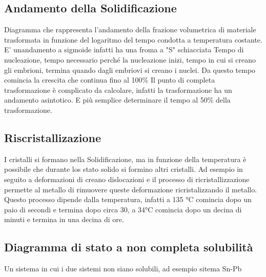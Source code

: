 \documentclass{article}%
\begin{document}
%
\subsection{ Andamento della Solidificazione }%
\label{subsec:AndamentodellaSolidificazione}%
Diagramma che rappresenta l'andamento della frazione volumetrica di materiale trasformata in funzione del logaritmo del tempo condotta a temperatura costante.\newline%
%
\newline%
%
E' unandamento a sigmoide infatti ha una froma a "S" schiacciata\newline%
%
\newline%
%
Tempo di nucleazione, tempo necessario perché la nucleazione inizi, tempo in cui si creano gli embrioni, termina quando dagli embriovi si creano i nuclei.\newline%
%
Da questo tempo comincia la crescita che continua fino al 100\%\newline%
%
Il punto di completa trasformazione è complicato da calcolare, infatti la trasformazione ha un andamento asintotico.\newline%
%
E più semplice determinare il tempo al 50\% della trasformazione.\newline%
%
\newline%

%
\subsection{ Riscristallizazione }%
\label{subsec:Riscristallizazione}%
I cristalli si formano nella Solidificazione, ma in funzione della temperatura è possibile che durante los stato solido si formino altri cristalli.\newline%
%
Ad esempio in seguito a deformazioni di creano dislocazioni e il processo di ricristallizzazione permette al metallo di rimuovere queste deformazione ricristalizzando il metallo.\newline%
%
\newline%
%
Questo processo dipende dalla temperatura, infatti a 135 °C comincia dopo un paio di secondi e termina dopo circa 30, a 34°C comincia dopo un decina di minuti e termina in una decina di ore.\newline%
%
\newline%

%
\subsection{ Diagramma di stato a non completa solubilità }%
\label{subsec:Diagrammadistatoanoncompletasolubilit}%
Un sistema in cui i due sistemi non siano solubili, ad esempio sitema Sn{-}Pb\newline%
%
\newline%
%
\end{document}
